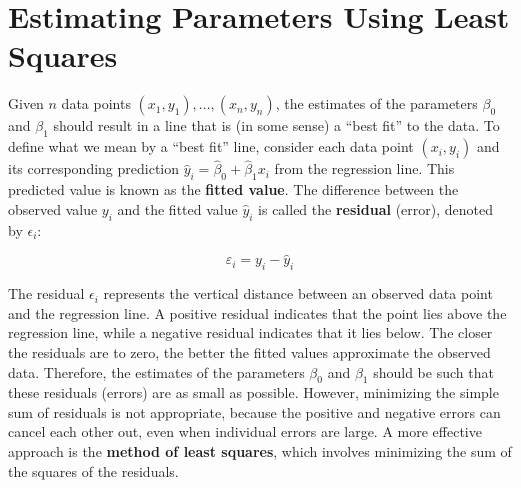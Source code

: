 \documentclass[twoside]{book}
\begin{document}


\section{Estimating Parameters Using Least Squares}

Given \( n \) data points \( (x_1, y_1), \ldots, (x_n, y_n) \), the estimates of the parameters \( \beta_0 \) and \( \beta_1 \) should result in a line that is (in some sense) a ``best ﬁt'' to the data. To define what we mean by a ``best fit'' line, consider each data point \( (x_i, y_i) \) and its corresponding prediction \( \hat{y}_i = \hat{\beta}_0 + \hat{\beta}_1 x_i \) from the regression line. This predicted value is known as the \textbf{fitted value}. The difference between the observed value \( y_i \) and the fitted value \( \hat{y}_i \) is called the \textbf{residual} (error), denoted by \( \epsilon_i \):

\begin{textbox}
    \[
\varepsilon_i = y_i - \hat{y}_i
\]
\end{textbox}

The residual \( \epsilon_i \) represents the vertical distance between an observed data point and the regression line. A positive residual indicates that the point lies above the regression line, while a negative residual indicates that it lies below. The closer the residuals are to zero, the better the fitted values approximate the observed data. Therefore, the estimates of the parameters \( \beta_0 \) and \( \beta_1 \) should be such that these residuals (errors) are as small as possible. However, minimizing the simple sum of residuals is not appropriate, because the positive and negative errors can cancel each other out, even when individual errors are large. A more effective approach is the \textbf{method of least squares}, which involves minimizing the sum of the squares of the residuals.
\end{document}

